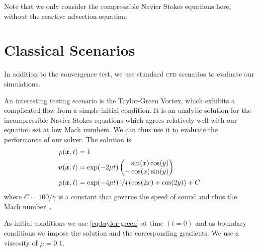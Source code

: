 Note that we only consider the compressible Navier Stokes equations here, without the reactive advection equation.

\section{Classical Scenarios}
In addition to the convergence test, we use standard \textsc{cfd} scenarios to evaluate our simulations.

An interesting testing scenario is the Taylor-Green Vortex, which exhibits a complicated flow from a simple initial condition.
It is an analytic solution for the incompressible Navier-Stokes equations which agrees relatively well with our equation set at low Mach numbers.
We can thus use it to evaluate the performance of our solver.
The solution is
\begin{align}
  \label{eq:taylor-green}
  \begin{split}
  \rho(\bm{x}, t) &= 1\\
  \bm{v}(\bm{x}, t) &= \exp(-2 \mu t)
  \begin{pmatrix}
    \phantom{-}\sin(x) \cos(y) \\
- \cos(x) \sin(y) 
    \end{pmatrix} \\
  p(\bm{x}, t) &= \exp(-4 \mu t) \, \nicefrac{1}{4} \left( \cos(2x) + \cos(2y) \right) + C
  \end{split}
\end{align}
where $C = 100/\gamma$ is a constant that governs the speed of sound and thus the Mach number~\cite{dumbser2016high}.

As initial conditions we use \cref{eq:taylor-green} at time $(t = 0)$ and as boundary conditions we impose the solution and the corresponding gradients.
We use a viscosity of $\mu = 0.1$.

